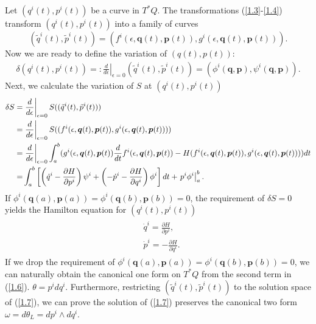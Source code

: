 \documentclass[a4paper,a4paper]{article}
\def\q{\boldsymbol{q}}
\def\p{\boldsymbol{p}}
\begin{document}
Let $(q^{i}(t), p^{i}(t))$ be a curve in $T^{*}Q$.  The
transformations (\ref{1.3}-\ref{1.4}) transform $(q^{i}(t),
p^{i}(t))$  into a family of curves
\[
         (\tilde{q}^{i}(t), \tilde{p}^{i}(t))
         =(f^{i}(\epsilon, \q(t), \p(t)), g^{i}(\epsilon, \q(t), \p(t))).
\]
Now we are ready to define the variation of $(q(t), p(t))$:
\begin{align}
   \delta(q^{i}(t), p^{i}(t))=:\left.\frac{d}{d\epsilon}\right|_{\epsilon=0}
      (\tilde{q}^{i}(t), \tilde{p}^{i}(t))=(\phi^{i}(\q, \p), \psi^{i}(\q, \p)).\label{1.5}
\end{align}
Next, we calculate the variation of $S$ at $(q^{i}(t), p^{i}(t))$
\small
\begin{align}
\delta S=&\left.\frac{d}{d\epsilon}\right|_{\epsilon=0}
            S((\tilde{q}^{i}(t), \tilde{p}^{i}(t))) \notag\\
        =&\left.\frac{d}{d\epsilon}\right|_{\epsilon=0}
            S((f^{i}(\epsilon, \q(t), \p(t)), g^{i}(\epsilon, \q(t), \p(t)))) \notag\\
        =&\left.\frac{d}{d\epsilon}\right|_{\epsilon=0}\int_{a}^{b}
          (g^{i}(\epsilon, \q(t), \p(t))\frac{d}{dt}f^{i}(\epsilon, \q(t), \p(t))
          -H(f^{i}(\epsilon, \q(t), \p(t)), g^{i}(\epsilon, \q(t), \p(t))))
          dt\notag\\
        =&\int_{a}^{b}\left[\left(\dot{q}^{i}-\frac{\partial H}{\partial p^{i}}\right)
          \psi^{i}+\left(-\dot{p}^{i}-\frac{\partial H}{\partial q^{i}}\right)\phi^{i} \right]dt
          +\left.p^{i}\phi^{i}\right|_{a}^{b}.\label{1.6}
\end{align}
\normalsize If $\phi^{i}(\q(a), \p(a))=\phi^{i}(\q(b), \p(b))=0$,
the requirement of $\delta S =0$ yields the Hamilton equation for
$(q^{i}(t), p^{i}(t))$
\begin{align}
\begin{split}
  & \dot{q}^{i}=\frac{\partial H}{\partial p^{i}},\\
  & \dot{p}^{i}=-\frac{\partial H}{\partial q^{i}}.
\end{split} \label{1.7}
\end{align}
If we drop the requirement of $\phi^{i}(\q(a),
\p(a))=\phi^{i}(\q(b), \p(b))=0$, we can naturally obtain the
canonical one form on $T^{*}Q$ from the second term in
(\ref{1.6}). $\theta=p^{i}dq^{i}$.  Furthermore, restricting
$(\tilde{q}^{i}(t), \tilde{p}^{i}(t))$ to the solution space of
(\ref{1.7}), we can prove the solution of (\ref{1.7}) preserves
the canonical two form $\omega=d\theta_{L}=dp^{i}\wedge dq^{i}$.
\end{document}
